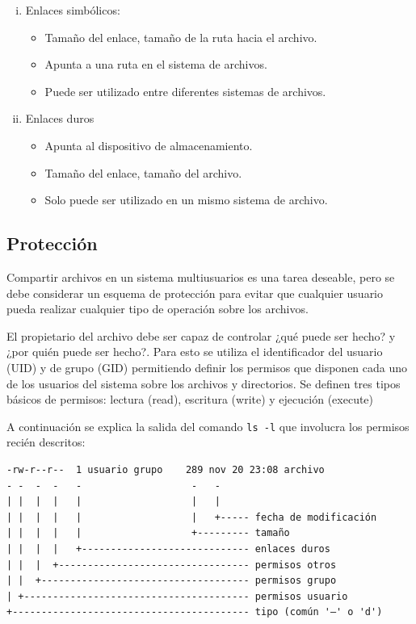 \begin{enumerate}[i.]
	\item Enlaces simbólicos:
	\begin{itemize}
		\item Tamaño del enlace, tamaño de la ruta hacia el archivo.
		\item Apunta a una ruta en el sistema de archivos.
		\item Puede ser utilizado entre diferentes sistemas de archivos.
	\end{itemize}
	\item Enlaces duros
	\begin{itemize}
		\item Apunta al dispositivo de almacenamiento.
		\item Tamaño del enlace, tamaño del archivo.
		\item Solo puede ser utilizado en un mismo sistema de archivo.
	\end{itemize}
\end{enumerate}

\subsection{Protección}

Compartir archivos en un sistema multiusuarios es una tarea deseable, pero se debe considerar un esquema de protección para evitar que cualquier usuario pueda realizar cualquier tipo de operación sobre los archivos.

El propietario del archivo debe ser capaz de controlar ¿qué puede ser hecho? y ¿por quién puede ser hecho?. Para esto se utiliza el identificador del usuario (UID) y de grupo (GID) permitiendo definir los permisos que disponen cada uno de los usuarios del sistema sobre los archivos y directorios. Se definen tres tipos básicos de permisos: lectura (read), escritura (write) y ejecución (execute)

A continuación se explica la salida del comando \texttt{ls -l} que involucra los permisos recién descritos:

\begin{verbatim}
-rw-r--r--  1 usuario grupo    289 nov 20 23:08 archivo
- -  -  -   -                   -   -
| |  |  |   |                   |   |
| |  |  |   |                   |   +----- fecha de modificación
| |  |  |   |                   +--------- tamaño
| |  |  |   +----------------------------- enlaces duros
| |  |  +--------------------------------- permisos otros
| |  +------------------------------------ permisos grupo
| +--------------------------------------- permisos usuario
+----------------------------------------- tipo (común '–' o 'd')
\end{verbatim}


